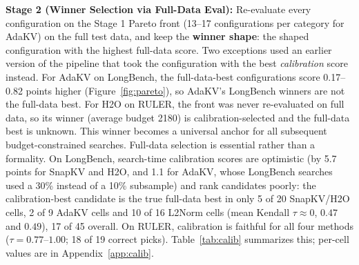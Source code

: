 \documentclass[11pt]{article}
\begin{document}
\textbf{Stage 2 (Winner Selection via Full-Data Eval):} Re-evaluate every configuration on the Stage 1 Pareto front (13--17 configurations per category for AdaKV) on the full test data, and keep the \textbf{winner shape}: the shaped configuration with the highest full-data score. Two exceptions used an earlier version of the pipeline that took the configuration with the best \emph{calibration} score instead. For AdaKV on LongBench, the full-data-best configurations score 0.17--0.82 points higher (Figure~\ref{fig:pareto}), so AdaKV's LongBench winners are not the full-data best. For H2O on RULER, the front was never re-evaluated on full data, so its winner (average budget 2180) is calibration-selected and the full-data best is unknown. This winner becomes a universal anchor for all subsequent budget-constrained searches. Full-data selection is essential rather than a formality. On LongBench, search-time calibration scores are optimistic (by 5.7 points for SnapKV and H2O, and 1.1 for AdaKV, whose LongBench searches used a 30\% instead of a 10\% subsample) and rank candidates poorly: the calibration-best candidate is the true full-data best in only 5 of 20 SnapKV/H2O cells, 2 of 9 AdaKV cells and 10 of 16 L2Norm cells (mean Kendall $\tau \approx 0$, $0.47$ and $0.49$), 17 of 45 overall. On RULER, calibration is faithful for all four methods ($\tau = 0.77$--$1.00$; 18 of 19 correct picks). Table~\ref{tab:calib} summarizes this; per-cell values are in Appendix~\ref{app:calib}.
\end{document}
